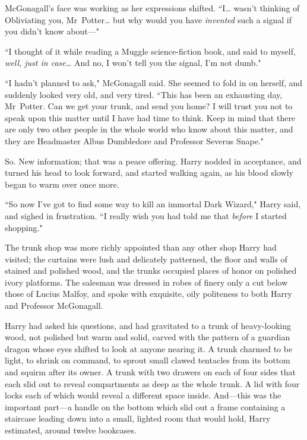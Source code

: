 McGonagall's face was working as her expressions shifted. ``I{\ldots} wasn't thinking of Obliviating you, Mr~Potter{\ldots} but why would you have \emph{invented} such a signal if you didn't know about—"

``I thought of it while reading a Muggle science-fiction book, and said to myself, \emph{well, just in case{\ldots}} And no, I won't tell you the signal, I'm not dumb."

``I hadn't planned to ask," McGonagall said. She seemed to fold in on herself, and suddenly looked very old, and very tired. ``This has been an exhausting day, Mr~Potter. Can we get your trunk, and send you home? I will trust you not to speak upon this matter until I have had time to think. Keep in mind that there are only two other people in the whole world who know about this matter, and they are Headmaster Albus Dumbledore and Professor Severus Snape."

So. New information; that was a peace offering. Harry nodded in acceptance, and turned his head to look forward, and started walking again, as his blood slowly began to warm over once more.

``So now I've got to find some way to kill an immortal Dark Wizard," Harry said, and sighed in frustration. ``I really wish you had told me that \emph{before} I started shopping."

\later

The trunk shop was more richly appointed than any other shop Harry had visited; the curtains were lush and delicately patterned, the floor and walls of stained and polished wood, and the trunks occupied places of honor on polished ivory platforms. The salesman was dressed in robes of finery only a cut below those of Lucius Malfoy, and spoke with exquisite, oily politeness to both Harry and Professor McGonagall.

Harry had asked his questions, and had gravitated to a trunk of heavy-looking wood, not polished but warm and solid, carved with the pattern of a guardian dragon whose eyes shifted to look at anyone nearing it. A trunk charmed to be light, to shrink on command, to sprout small clawed tentacles from its bottom and squirm after its owner. A trunk with two drawers on each of four sides that each slid out to reveal compartments as deep as the whole trunk. A lid with four locks each of which would reveal a different space inside. And—this was the important part—a handle on the bottom which slid out a frame containing a staircase leading down into a small, lighted room that would hold, Harry estimated, around twelve bookcases.

